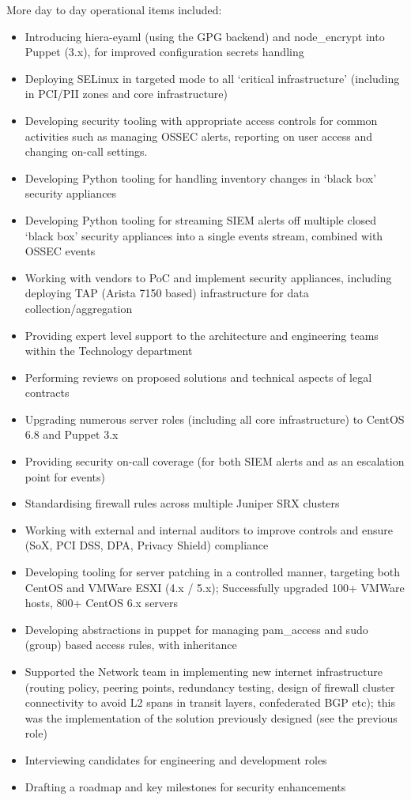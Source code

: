 More day to day operational items included:

\begin{itemize}
\itemsep1pt\parskip0pt
\item
  Introducing hiera-eyaml (using the GPG backend) and node\_encrypt into
  Puppet (3.x), for improved configuration secrets handling
\item
  Deploying SELinux in targeted mode to all `critical infrastructure'
  (including in PCI/PII zones and core infrastructure)
\item
  Developing security tooling with appropriate access controls for
  common activities such as managing OSSEC alerts, reporting on user
  access and changing on-call settings.
\item
  Developing Python tooling for handling inventory changes in `black
  box' security appliances
\item
  Developing Python tooling for streaming SIEM alerts off multiple
  closed `black box' security appliances into a single events stream,
  combined with OSSEC events
\item
  Working with vendors to PoC and implement security appliances,
  including deploying TAP (Arista 7150 based) infrastructure for data
  collection/aggregation
\item
  Providing expert level support to the architecture and engineering
  teams within the Technology department
\item
  Performing reviews on proposed solutions and technical aspects of
  legal contracts
\item
  Upgrading numerous server roles (including all core infrastructure) to
  CentOS 6.8 and Puppet 3.x
\item
  Providing security on-call coverage (for both SIEM alerts and as an
  escalation point for events)
\item
  Standardising firewall rules across multiple Juniper SRX clusters
\item
  Working with external and internal auditors to improve controls and
  ensure (SoX, PCI DSS, DPA, Privacy Shield) compliance
\item
  Developing tooling for server patching in a controlled manner,
  targeting both CentOS and VMWare ESXI (4.x / 5.x); Successfully
  upgraded 100+ VMWare hosts, 800+ CentOS 6.x servers
\item
  Developing abstractions in puppet for managing pam\_access and sudo
  (group) based access rules, with inheritance
\item
  Supported the Network team in implementing new internet infrastructure
  (routing policy, peering points, redundancy testing, design of
  firewall cluster connectivity to avoid L2 spans in transit layers,
  confederated BGP etc); this was the implementation of the solution
  previously designed (see the previous role)
\item
  Interviewing candidates for engineering and development roles
\item
  Drafting a roadmap and key milestones for security enhancements
\end{itemize}

